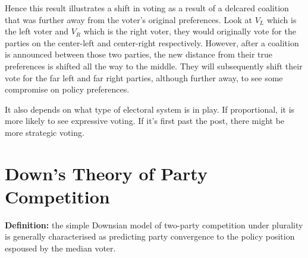 \documentclass[12pt, letterpaper]{article}
\begin{document}
\begin{enumerate}
	Hence this result illustrates a shift in voting as a result of a delcared coalition that was further away from the voter's original preferences. Look at $V_L$ which is the left voter and $V_R$ which is the right voter, they would originally vote for the parties on the center-left and center-right respectively. However, after a coalition is announced between those two parties, the new distance from their true preferences is shifted all the way to the middle. They will subsequently shift their vote for the far left and far right parties, although further away, to see some compromise on policy preferences.
\end{enumerate}
It also depends on what type of electoral system is in play. If proportional, it is more likely to see expressive voting. If it's first past the post, there might be more strategic voting.

\newpage
\section{Down's Theory of Party Competition}
\textbf{Definition:} the simple Downsian model of two-party competition under plurality is generally characterised as predicting party convergence to the policy position espoused by the median voter.
\end{document}

